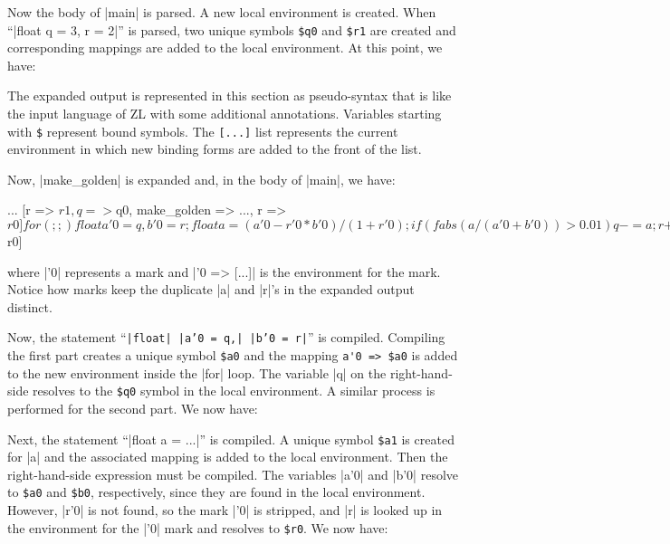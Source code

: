 Now the body of |main| is parsed.  A new local environment is
created.  When ``|float q = 3, r = 2|'' is parsed, two unique symbols
\verb/$q0/ and \verb/$r1/ are created and corresponding mappings are
added to the local environment.  At this point, we have:
The expanded output is represented in this section as
pseudo-syntax that is like the input language of ZL with some
additional annotations.  Variables starting with \verb/$/ represent bound
symbols.  The \verb/[...]/ list represents the current environment
in which new binding forms are added to the front of the list.

Now, |make_golden| is expanded and, in the body of |main|, we have:
\begin{code}
  ...
  [r => $r1, q => $q0, make_golden => ..., r => $r0]
  for (;;) { float a'0 = q, b'0 = r;
             float a = (a'0 - r'0*b'0)/(1 + r'0);
             if (fabs(a/(a'0+b'0)) > 0.01) 
               {q -= a; r += a;} 
             else break; }
  '0 => [r => $r0]
\end{code}
where |'0| represents a mark and |'0 => [...]| is the environment for
the mark.  Notice how marks keep the duplicate |a| and |r|'s in
the expanded output distinct.

Now, the statement ``{\tt |float| |a'0 = q,| |b'0 = r|}'' is compiled.
Compiling the first part creates a unique symbol \verb/$a0/ and the
mapping \verb/a'0 => $a0/ is added to the new environment inside the
|for| loop.    The variable |q| on the
right-hand-side resolves to the \verb/$q0/ symbol in the local
environment.  A similar process is performed for the second part.  We
now have:

Next, the statement ``|float a = ...|'' is compiled.  A unique
symbol \verb/$a1/ is created for |a| and the associated mapping is
added to the local environment.  Then the right-hand-side expression must be
compiled.  The variables |a'0| and |b'0| resolve to \verb/$a0/ and
\verb/$b0/, respectively, since they are found in the local environment.
However, |r'0| is not found, so the mark |'0| is stripped, and |r|
is looked up in the environment for the |'0| mark and resolves to
\verb/$r0/. We now have:

